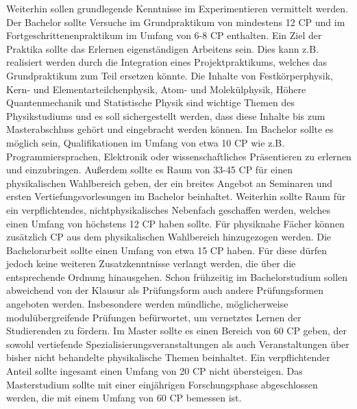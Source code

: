         Weiterhin sollen grundlegende Kenntnisse im Experimentieren vermittelt werden. Der Bachelor sollte Versuche im Grundpraktikum
        von mindestens 12 CP und im Fortgeschrittenenpraktikum im Umfang von 6-8 CP enthalten. Ein Ziel der Praktika sollte das Erlernen
        eigenständigen Arbeitens sein. Dies kann z.B. realisiert werden durch die Integration eines Projektpraktikums, welches das
        Grundpraktikum zum Teil ersetzen könnte.
        Die Inhalte von Festkörperphysik, Kern- und Elementarteilchenphysik, Atom- und Molekülphysik, Höhere Quantenmechanik und
        Statistische Physik sind wichtige Themen des Physikstudiums und es soll sichergestellt werden, dass diese Inhalte bis zum
        Masterabschluss gehört und eingebracht werden können.
        Im Bachelor sollte es möglich sein, Qualifikationen im Umfang von etwa 10 CP wie z.B. Programmiersprachen, Elektronik oder
        wissenschaftliches Präsentieren zu erlernen und einzubringen. Außerdem sollte es Raum von 33-45 CP für einen physikalischen Wahlbereich
        geben, der ein breites Angebot an Seminaren und ersten Vertiefungsvorlesungen im Bachelor beinhaltet.
        Weiterhin sollte Raum für ein verpflichtendes, nichtphysikalisches Nebenfach geschaffen werden, welches einen Umfang von höchstens
        12 CP haben sollte. Für physiknahe Fächer können zusätzlich CP aus dem physikalischen Wahlbereich hinzugezogen werden.
        Die Bachelorarbeit sollte einen Umfang von etwa 15 CP haben. Für diese dürfen jedoch keine weiteren Zusatzkenntnisse verlangt werden,
        die über die entsprechende Ordnung hinausgehen.
        Schon frühzeitig im Bachelorstudium sollen abweichend von der Klausur als Prüfungsform auch andere Prüfungsformen angeboten werden.
        Insbesondere werden mündliche, möglicherweise modulübergreifende Prüfungen befürwortet, um vernetztes Lernen der Studierenden zu fördern.
        Im Master sollte es einen Bereich von 60 CP geben, der sowohl vertiefende Spezialisierungsveranstaltungen als auch Veranstaltungen
        über bisher nicht behandelte physikalische Themen beinhaltet. Ein verpflichtender Anteil sollte ingesamt einen Umfang von 20 CP nicht
        übersteigen.
        Das Masterstudium sollte mit einer einjährigen Forschungsphase abgeschlossen werden, die mit einem Umfang von 60 CP bemessen ist.
